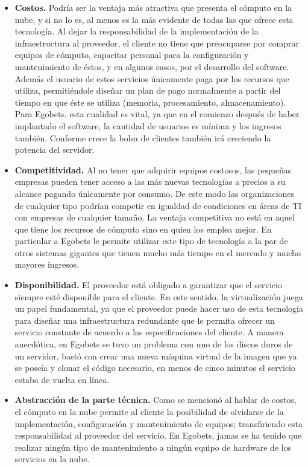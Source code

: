 \begin{itemize}
	\item \textbf{Costos.} Podría ser la ventaja más atractiva que presenta el cómputo en la nube, y si no lo es, al menos es la más evidente de todas las que ofrece esta tecnología. Al dejar la responsabilidad de la implementación de la infraestructura al proveedor, el cliente no tiene que preocuparse por comprar equipos de cómputo, capacitar personal para la configuración y mantenimiento de éstos, y en algunos casos, por el desarrollo del software. Además el usuario de estos servicios únicamente paga por los recursos que utiliza, permitiéndole diseñar un plan de pago normalmente a partir del tiempo en que éste se utiliza (memoria, procesamiento, almacenamiento). Para Egobets, esta cualidad es vital, ya que en el comienzo después de haber implantado el software, la cantidad de usuarios es mínima y los ingresos también. Conforme crece la bolsa de clientes también irá creciendo la potencia del servidor.

	\item \textbf{Competitividad.} Al no tener que adquirir equipos costosos, las pequeñas empresas pueden tener acceso a las más nuevas tecnologías a precios a su alcance pagando únicamente por consumo. De este modo las organizaciones de cualquier tipo podrían competir en igualdad de condiciones en áreas de TI con empresas de cualquier tamaño. La ventaja competitiva no está en aquel que tiene los recursos de cómputo sino en quien los emplea mejor. En particular a Egobets le permite utilizar este tipo de tecnología a la par de otros sistemas gigantes que tienen mucho más tiempo en el mercado y mucho mayores ingresos.

	\item \textbf{Disponibilidad.} El proveedor está obligado a garantizar que el servicio siempre esté disponible para el cliente. En este sentido, la virtualización juega un papel fundamental, ya que el proveedor puede hacer uso de esta tecnología para diseñar una infraestructura redundante que le permita ofrecer un servicio constante de acuerdo a las especificaciones del cliente. A manera anecdótica, en Egobets se tuvo un problema con uno de los discos duros de un servidor, bastó con crear una nueva máquina virtual de la imagen que ya se poseía y clonar el código necesario, en menos de cinco minutos el servicio estaba de vuelta en línea.

	\item \textbf{Abstracción de la parte técnica.} Como se mencionó al hablar de costos, el cómputo en la nube permite al cliente la posibilidad de olvidarse de la implementación, configuración y mantenimiento de equipos; transfiriendo esta responsabilidad al proveedor del servicio. En Egobets, jamas se ha tenido que realizar ningún tipo de mantenimiento a ningún equipo de hardware de los servicios en la nube.


\end{itemize}
